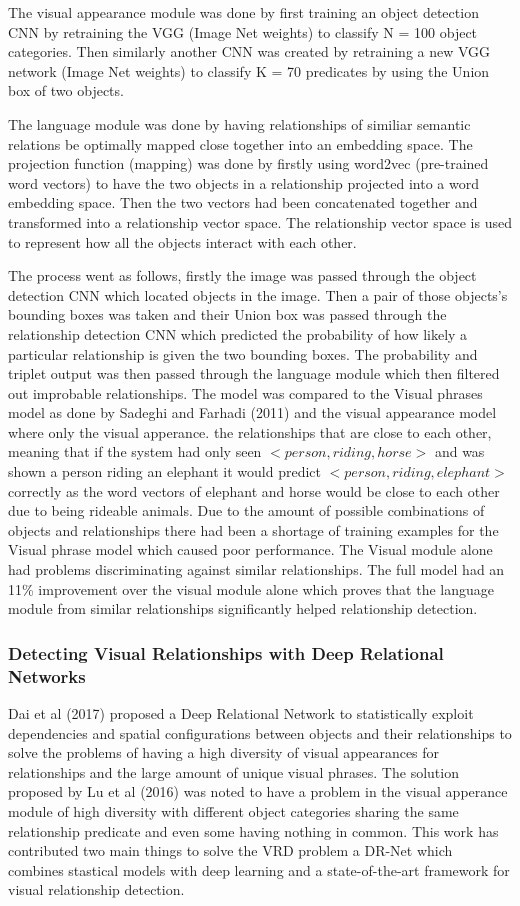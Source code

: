 \documentclass{csfyp}
\begin{document}
The visual appearance module was done by first training an object detection CNN by retraining the VGG (Image Net weights) to classify N = 100 object categories. Then similarly another CNN was created by retraining a new VGG network (Image Net weights) to classify K = 70 predicates by using the Union box of two objects. 

The language module was done by having relationships of similiar semantic relations be optimally mapped close together into an embedding space. The projection function (mapping) was done by firstly using word2vec (pre-trained word vectors) to have the two objects in a relationship projected into a word embedding space. Then the two vectors had been concatenated together and transformed into a relationship vector space. The relationship vector space is used to represent how all the objects interact with each other. 

The process went as follows, firstly the image was passed through the object detection CNN which located objects in the image. Then a pair of those objects’s bounding boxes was taken and their Union box was passed through the relationship detection CNN which predicted the probability of how likely a particular relationship is given the two bounding boxes. The probability and triplet output was then passed through the language module which then filtered out improbable relationships. The model was compared to the Visual phrases model as done  by Sadeghi and Farhadi (2011) and the visual appearance model where only the visual apperance.
the relationships that are close to each other, meaning that if the system had only seen $<person , riding , horse>$ and was shown a person riding an elephant it would predict $<person , riding , elephant>$ correctly as the word vectors of elephant and horse would be close to each other due to being rideable animals. Due to the amount of possible combinations of objects and relationships there had been a shortage of training examples for the Visual phrase model which caused poor performance. The Visual module alone had problems discriminating against similar relationships. The full model had an 11\% improvement over the visual module alone which proves that the language module from similar relationships significantly helped relationship detection. 

\subsubsection{Detecting Visual Relationships with Deep Relational Networks}
Dai et al (2017) proposed a Deep Relational Network to statistically exploit dependencies and spatial configurations between objects and their relationships to solve the problems of having a high diversity of visual appearances for relationships and the large amount of unique visual phrases.  The solution proposed by Lu et al (2016) was noted to have a problem in the visual apperance module of high diversity with different object categories sharing the same relationship predicate and even some having nothing in common. 
	This work has contributed two main things to solve the VRD problem a DR-Net which combines stastical models with deep learning and a state-of-the-art framework for visual relationship detection. 
\end{document}
